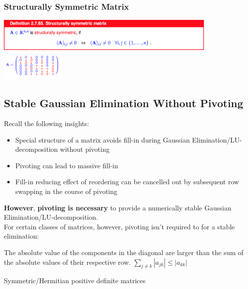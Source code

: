 \documentclass[12pt, a4paper]{article}
\begin{document}
\subsubsection{Structurally Symmetric Matrix}

\begin{center}
	\includegraphics[width=310pt]{ssmatrix.png}
	\includegraphics[width=0.24\textwidth]{strucSymMatrix.png}
\end{center}

\subsection{Stable Gaussian Elimination Without Pivoting}

Recall the following insights:
\begin{itemize}[noitemsep]
	\item Special structure of a matrix avoids fill-in during Gaussian Elimination/LU-decomposition without pivoting
	\item Pivoting can lead to massive fill-in
	\item Fill-in reducing effect of reordering can be cancelled out by subsequent row swapping in the course of pivoting 
\end{itemize}

\textbf{However}, \textbf{pivoting is necessary} to provide a numerically stable Gaussian Elimination/LU-decomposition. \\

For certain classes of matrices, however, pivoting isn't required to for a stable elimination:

\begin{description}[labelindent=16pt,style=multiline,leftmargin=7cm, noitemsep]
	\item[Diagonally Dominant Matrix:] The absolute value of the components in the diagonal are larger than the sum of the absolute values of their respective row. $\sum_{j\neq k}|a_{jk}| \leq |a_{kk}|$
	\item[s.p.d. Matrix:] Symmetric/Hermitian positive definite matrices
\end{description}
\end{document}
